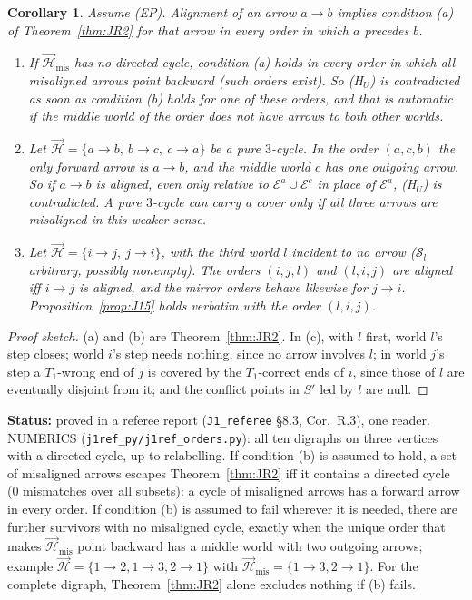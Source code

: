 \documentclass[11pt]{article}
\newtheorem{corollary}[theorem]{Corollary}
\theoremstyle{definition}
\theoremstyle{remark}
\newcommand{\src}[1]{\texttt{#1}}
\newcommand{\status}[1]{\par\smallskip\noindent\textbf{Status:} #1\par\smallskip}
\begin{document}
\begin{corollary}\label{cor:JR3}
Assume (EP). Alignment of an arrow $a\to b$ implies condition (a) of Theorem~\ref{thm:JR2} for that arrow in every order in which $a$ precedes $b$.
\begin{enumerate}[leftmargin=*,label=(\alph*)]
\item If $\vec{\mathcal H}_{\mathrm{mis}}$ has no directed cycle, condition (a) holds in every order in which all misaligned arrows point backward (such orders exist). So (H$_U$) is contradicted as soon as condition (b) holds for one of these orders, and that is automatic if the middle world of the order does not have arrows to both other worlds.
\item Let $\vec{\mathcal H}=\{a\to b,\ b\to c,\ c\to a\}$ be a pure $3$-cycle. In the order $(a,c,b)$ the only forward arrow is $a\to b$, and the middle world $c$ has one outgoing arrow. So if $a\to b$ is aligned, even only relative to $\mathcal E^a\cup\mathcal E^c$ in place of $\mathcal E^a$, (H$_U$) is contradicted. A pure $3$-cycle can carry a cover only if all three arrows are misaligned in this weaker sense.
\item Let $\vec{\mathcal H}=\{i\to j,\ j\to i\}$, with the third world $l$ incident to no arrow ($\mathcal S_l$ arbitrary, possibly nonempty). The orders $(i,j,l)$ and $(l,i,j)$ are aligned iff $i\to j$ is aligned, and the mirror orders behave likewise for $j\to i$. Proposition~\ref{prop:J15} holds verbatim with the order $(l,i,j)$.
\end{enumerate}
\end{corollary}
\begin{proof}[Proof sketch]
(a) and (b) are Theorem~\ref{thm:JR2}. In (c), with $l$ first, world $l$'s step closes; world $i$'s step needs nothing, since no arrow involves $l$; in world $j$'s step a $T_1$-wrong end of $j$ is covered by the $T_1$-correct ends of $i$, since those of $l$ are eventually disjoint from it; and the conflict points in $S'$ led by $l$ are null.
\end{proof}
\status{proved in a referee report (\src{J1\_referee} \S8.3, Cor.~R.3), one reader. NUMERICS (\src{j1ref\_py/j1ref\_orders.py}): all ten digraphs on three vertices with a directed cycle, up to relabelling. If condition (b) is assumed to hold, a set of misaligned arrows escapes Theorem~\ref{thm:JR2} iff it contains a directed cycle (0 mismatches over all subsets): a cycle of misaligned arrows has a forward arrow in every order. If condition (b) is assumed to fail wherever it is needed, there are further survivors with no misaligned cycle, exactly when the unique order that makes $\vec{\mathcal H}_{\mathrm{mis}}$ point backward has a middle world with two outgoing arrows; example $\vec{\mathcal H}=\{1\to2,1\to3,2\to1\}$ with $\vec{\mathcal H}_{\mathrm{mis}}=\{1\to3,2\to1\}$. For the complete digraph, Theorem~\ref{thm:JR2} alone excludes nothing if (b) fails.}
\end{document}
